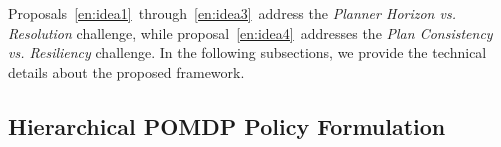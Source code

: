 \documentclass[letterpaper]{article} %
\begin{document}
Proposals~\ref{en:idea1}~through~\ref{en:idea3}~address the \textit{Planner Horizon vs. Resolution} challenge, while proposal~\ref{en:idea4}~addresses the \textit{Plan Consistency vs. Resiliency} challenge. In the following subsections, we provide the technical details about the proposed framework.



\subsection{Hierarchical POMDP Policy Formulation}
\label{ssec:hierarchical_policy}

\end{document}
